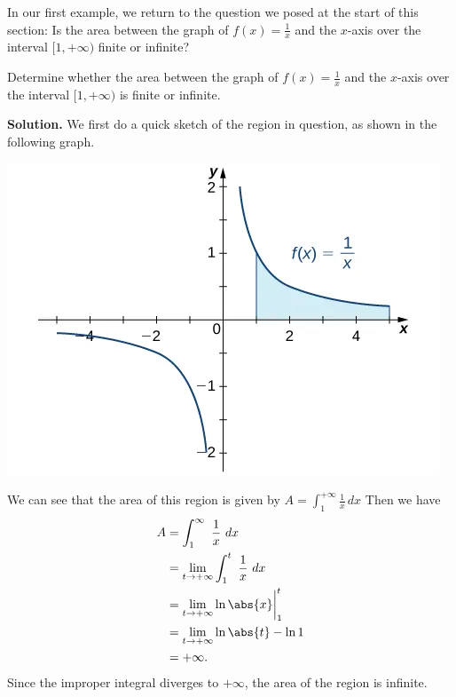 \documentclass{report}
\begin{document}
        \pagebreak \bigbreak \noindent 
        In our first example, we return to the question we posed at the start of this section: Is the area between the graph of \( f(x) = \frac{1}{x} \) and the \( x \)-axis over the interval \([1, +\infty)\) finite or infinite?
        \bigbreak \noindent 
        \begin{eg}
            Determine whether the area between the graph of \( f(x) = \frac{1}{x} \) and the \( x \)-axis over the interval \([1, +\infty)\) is finite or infinite.
        \end{eg}
        \bigbreak \noindent \bigbreak \noindent 
        \textbf{Solution.} We first do a quick sketch of the region in question, as shown in the following graph.
        \bigbreak \noindent 
        \begin{minipage}[]{0.47\textwidth}
         \begin{center}
            \includegraphics[scale=.5]{./figures/mane3.png}
        \end{center}
        \end{minipage}
        \begin{minipage}[]{0.47\textwidth}
            We can see that the area of this region is given by   $A = \int_{1}^{+\infty} \frac{1}{x} \, dx$ Then we have
            \begin{align*}
                A &= \int_{1}^{\infty}\ \frac{1}{x}\ dx \\
                &= \lim\limits_{t \to +\infty}{\int_{1}^{t}\ \frac{1}{x}\ dx} \\
                &= \lim\limits_{t \to +\infty}{\ln{\abs{x}}}\bigg|_1^{t} \\
                &= \lim\limits_{t \to +\infty}{\ln{\abs{t}} - \ln{1}} \\
                &=+\infty
            .\end{align*}
            Since the improper integral diverges to  $+\infty$, the area of the region is infinite.
        \end{minipage}
\end{document}
